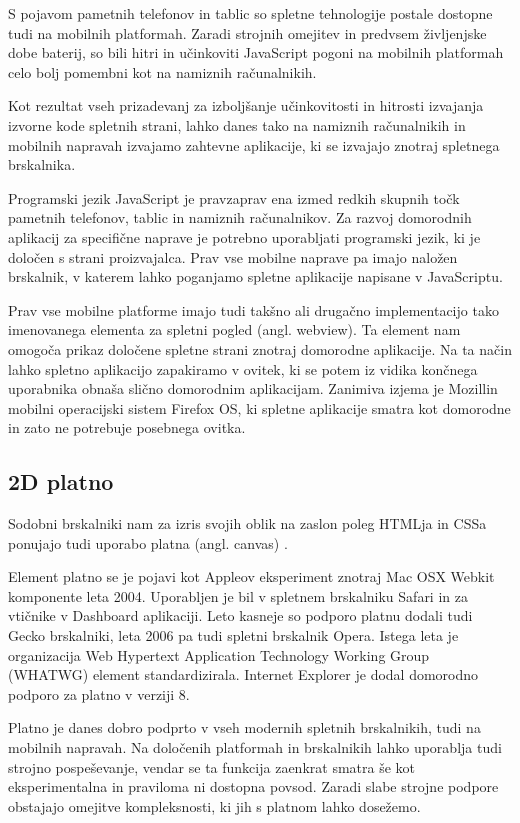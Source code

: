 S pojavom pametnih telefonov in tablic so spletne tehnologije postale dostopne tudi na mobilnih platformah. Zaradi strojnih omejitev in predvsem življenjske dobe baterij, so bili hitri in učinkoviti JavaScript pogoni na mobilnih platformah celo bolj pomembni kot na namiznih računalnikih.

Kot rezultat vseh prizadevanj za izboljšanje učinkovitosti in hitrosti izvajanja izvorne kode spletnih strani, lahko danes tako na namiznih računalnikih in mobilnih napravah izvajamo zahtevne aplikacije, ki se izvajajo znotraj spletnega brskalnika.

Programski jezik JavaScript je pravzaprav ena izmed redkih skupnih točk pametnih telefonov, tablic in namiznih računalnikov. Za razvoj domorodnih aplikacij za specifične naprave je potrebno uporabljati programski jezik, ki je določen s strani proizvajalca. Prav vse mobilne naprave pa imajo naložen brskalnik, v katerem lahko poganjamo spletne aplikacije napisane v JavaScriptu.

Prav vse mobilne platforme imajo tudi takšno ali drugačno implementacijo tako imenovanega elementa za spletni pogled (angl. webview). Ta element nam omogoča prikaz določene spletne strani znotraj domorodne aplikacije. Na ta način lahko spletno aplikacijo zapakiramo v ovitek, ki se potem iz vidika končnega uporabnika obnaša slično domorodnim aplikacijam. Zanimiva izjema je Mozillin mobilni operacijski sistem Firefox OS, ki spletne aplikacije smatra kot domorodne in zato ne potrebuje posebnega ovitka.

\subsection{2D platno}
\label{sec:2dcanvas}
Sodobni brskalniki nam za izris svojih oblik na zaslon poleg HTMLja in CSSa ponujajo tudi uporabo platna (angl. canvas) \cite{canvas}. 

Element platno se je pojavi kot Appleov eksperiment znotraj Mac OSX Webkit komponente leta 2004. Uporabljen je bil v spletnem brskalniku Safari in za vtičnike v Dashboard aplikaciji. Leto kasneje so podporo platnu dodali tudi Gecko brskalniki, leta 2006 pa tudi spletni brskalnik Opera. Istega leta je organizacija Web Hypertext Application Technology Working Group (WHATWG) element standardizirala. Internet Explorer je dodal domorodno podporo za platno v verziji 8.

Platno je danes dobro podprto v vseh modernih spletnih brskalnikih, tudi na mobilnih napravah. Na določenih platformah in brskalnikih lahko uporablja tudi strojno pospeševanje, vendar se ta funkcija zaenkrat smatra še kot eksperimentalna in praviloma ni dostopna povsod. Zaradi slabe strojne podpore obstajajo omejitve kompleksnosti, ki jih s platnom lahko dosežemo.


